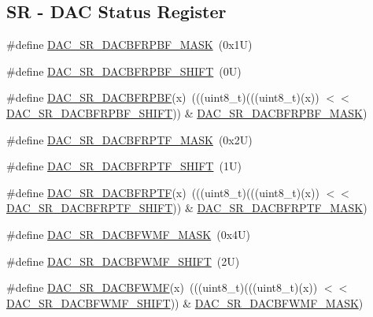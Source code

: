 \subsection*{SR -\/ D\+AC Status Register}
\begin{DoxyCompactItemize}
\item 
\#define \mbox{\hyperlink{group___d_a_c___register___masks_ga5af56fd75a9c5b74fe07c8f303d452aa}{D\+A\+C\+\_\+\+S\+R\+\_\+\+D\+A\+C\+B\+F\+R\+P\+B\+F\+\_\+\+M\+A\+SK}}~(0x1\+U)
\item 
\#define \mbox{\hyperlink{group___d_a_c___register___masks_ga5581f254327f3d4e57b161b5c771fb1c}{D\+A\+C\+\_\+\+S\+R\+\_\+\+D\+A\+C\+B\+F\+R\+P\+B\+F\+\_\+\+S\+H\+I\+FT}}~(0\+U)
\item 
\#define \mbox{\hyperlink{group___d_a_c___register___masks_ga58daf0fee335108d3e29833050e418d8}{D\+A\+C\+\_\+\+S\+R\+\_\+\+D\+A\+C\+B\+F\+R\+P\+BF}}(x)~(((uint8\+\_\+t)(((uint8\+\_\+t)(x)) $<$$<$ \mbox{\hyperlink{group___d_a_c___register___masks_ga5581f254327f3d4e57b161b5c771fb1c}{D\+A\+C\+\_\+\+S\+R\+\_\+\+D\+A\+C\+B\+F\+R\+P\+B\+F\+\_\+\+S\+H\+I\+FT}})) \& \mbox{\hyperlink{group___d_a_c___register___masks_ga5af56fd75a9c5b74fe07c8f303d452aa}{D\+A\+C\+\_\+\+S\+R\+\_\+\+D\+A\+C\+B\+F\+R\+P\+B\+F\+\_\+\+M\+A\+SK}})
\item 
\#define \mbox{\hyperlink{group___d_a_c___register___masks_ga662e824677c1a7a94ddd36e90f3d37d5}{D\+A\+C\+\_\+\+S\+R\+\_\+\+D\+A\+C\+B\+F\+R\+P\+T\+F\+\_\+\+M\+A\+SK}}~(0x2\+U)
\item 
\#define \mbox{\hyperlink{group___d_a_c___register___masks_gad1df4286616f5369388e865f5f821ae9}{D\+A\+C\+\_\+\+S\+R\+\_\+\+D\+A\+C\+B\+F\+R\+P\+T\+F\+\_\+\+S\+H\+I\+FT}}~(1\+U)
\item 
\#define \mbox{\hyperlink{group___d_a_c___register___masks_ga9677e128f12db2c318c7eb821f5af0b1}{D\+A\+C\+\_\+\+S\+R\+\_\+\+D\+A\+C\+B\+F\+R\+P\+TF}}(x)~(((uint8\+\_\+t)(((uint8\+\_\+t)(x)) $<$$<$ \mbox{\hyperlink{group___d_a_c___register___masks_gad1df4286616f5369388e865f5f821ae9}{D\+A\+C\+\_\+\+S\+R\+\_\+\+D\+A\+C\+B\+F\+R\+P\+T\+F\+\_\+\+S\+H\+I\+FT}})) \& \mbox{\hyperlink{group___d_a_c___register___masks_ga662e824677c1a7a94ddd36e90f3d37d5}{D\+A\+C\+\_\+\+S\+R\+\_\+\+D\+A\+C\+B\+F\+R\+P\+T\+F\+\_\+\+M\+A\+SK}})
\item 
\#define \mbox{\hyperlink{group___d_a_c___register___masks_ga612ec408d340d5011ff4326eda077ae3}{D\+A\+C\+\_\+\+S\+R\+\_\+\+D\+A\+C\+B\+F\+W\+M\+F\+\_\+\+M\+A\+SK}}~(0x4\+U)
\item 
\#define \mbox{\hyperlink{group___d_a_c___register___masks_ga01791b2f636fa97d33fa49d410ca8b44}{D\+A\+C\+\_\+\+S\+R\+\_\+\+D\+A\+C\+B\+F\+W\+M\+F\+\_\+\+S\+H\+I\+FT}}~(2\+U)
\item 
\#define \mbox{\hyperlink{group___d_a_c___register___masks_gab8d73c39fdf9b352de329c5fba7c9c77}{D\+A\+C\+\_\+\+S\+R\+\_\+\+D\+A\+C\+B\+F\+W\+MF}}(x)~(((uint8\+\_\+t)(((uint8\+\_\+t)(x)) $<$$<$ \mbox{\hyperlink{group___d_a_c___register___masks_ga01791b2f636fa97d33fa49d410ca8b44}{D\+A\+C\+\_\+\+S\+R\+\_\+\+D\+A\+C\+B\+F\+W\+M\+F\+\_\+\+S\+H\+I\+FT}})) \& \mbox{\hyperlink{group___d_a_c___register___masks_ga612ec408d340d5011ff4326eda077ae3}{D\+A\+C\+\_\+\+S\+R\+\_\+\+D\+A\+C\+B\+F\+W\+M\+F\+\_\+\+M\+A\+SK}})
\end{DoxyCompactItemize}

